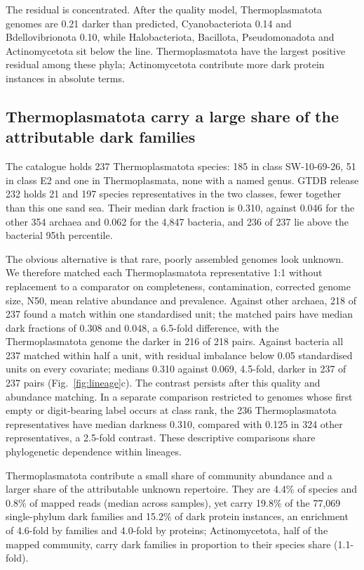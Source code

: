\documentclass[11pt]{article}
\begin{document}
The residual is concentrated. After the quality model, Thermoplasmatota genomes are 0.21 darker than
predicted, Cyanobacteriota 0.14 and Bdellovibrionota 0.10, while Halobacteriota, Bacillota,
Pseudomonadota and Actinomycetota sit below the line. Thermoplasmatota have the largest positive residual among these phyla; Actinomycetota contribute more dark protein instances in absolute terms.

\subsection*{Thermoplasmatota carry a large share of the attributable dark families}

The catalogue holds 237 Thermoplasmatota species: 185 in class SW-10-69-26, 51 in class E2 and one
in Thermoplasmata, none with a named genus. GTDB release 232 holds 21 and 197 species
representatives in the two classes, fewer together than this one sand sea. Their median dark
fraction is 0.310, against 0.046 for the other 354 archaea and 0.062 for the 4{,}847 bacteria, and
236 of 237 lie above the bacterial 95th percentile.

The obvious alternative is that rare, poorly assembled genomes look unknown. We therefore matched
each Thermoplasmatota representative 1:1 without replacement to a comparator on completeness,
contamination, corrected genome size, N50, mean relative abundance and prevalence. Against other
archaea, 218 of 237 found a match within one standardised unit; the matched pairs have median dark
fractions of 0.308 and 0.048, a 6.5-fold difference, with the Thermoplasmatota genome the darker in
216 of 218 pairs. Against bacteria all 237 matched within half a unit, with residual imbalance below
0.05 standardised units on every covariate; medians 0.310 against 0.069, 4.5-fold, darker in 237 of
237 pairs (Fig.~\ref{fig:lineage}c). The contrast persists after this quality and abundance matching. In a separate comparison
restricted to genomes whose first empty or digit-bearing label occurs at class rank, the 236
Thermoplasmatota representatives have median darkness 0.310, compared with 0.125 in 324 other
representatives, a 2.5-fold contrast. These descriptive comparisons share phylogenetic dependence
within lineages.

Thermoplasmatota contribute a small share of community abundance and a larger share of the
attributable unknown repertoire. They are 4.4\%
of species and 0.8\% of mapped reads (median across samples), yet carry 19.8\% of the 77{,}069
single-phylum dark families and 15.2\% of dark protein instances, an enrichment of 4.6-fold by
families and 4.0-fold by proteins; Actinomycetota, half of the mapped community, carry dark families
in proportion to their species share (1.1-fold).
\end{document}

